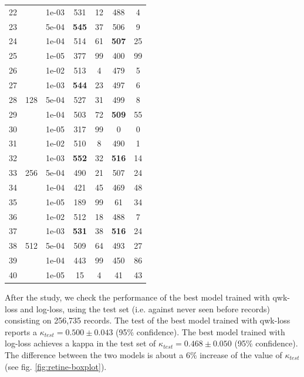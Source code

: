 \documentclass[times,twocolumn,final,authoryear]{elsarticle}
\begin{document}
\begin{table}[h!]
{\begin{tabular}{c|c|c|c|c|c|c}
			22 &                     & 1e-03 & 531 & 12 & 488 & 4\\
			23 &                     & 5e-04 & \textbf{545} & 37 & 506 & 9\\
			24 &                     & 1e-04 & 514 & 61 & \textbf{507} & 25\\
			25 &                     & 1e-05 & 377 & 99 & 400 & 99\\
			\hline	
			26 & \multirow{5}{*}{128} & 1e-02 & 513 & 4 & 479 & 5\\
			27 &                      & 1e-03 & \textbf{544} & 23 & 497 & 6\\
			28 &                      & 5e-04 & 527 & 31 & 499 & 8\\
			29 &                      & 1e-04 & 503 & 72 & \textbf{509} & 55\\
			30 &                      & 1e-05 & 317 & 99 &   0 & 0\\
			\hline	
			31 & \multirow{5}{*}{256} & 1e-02 & 510 & 8 & 490 & 1\\
			32 &                      & 1e-03 & \textbf{552} & 32 & \textbf{516} & 14\\
			33 &                      & 5e-04 & 490 & 21 & 507 & 24\\
			34 &                      & 1e-04 & 421 & 45 & 469 & 48\\
			35 &                      & 1e-05 & 189 & 99 & 61 & 34\\
			\hline	
			36 & \multirow{5}{*}{512} & 1e-02 & 512 & 18 & 488 & 7\\
			37 &                      & 1e-03 & \textbf{531} & 38 & \textbf{516} & 24\\
			38 &                      & 5e-04 & 509 & 64 & 493 & 27\\
			39 &                      & 1e-04 & 443 & 99 & 450 & 86\\
			40 &                      & 1e-05 & 15 & 4 & 41 & 43\\
			\hline			
		\end{tabular}
	}
\end{table}

After the study, we check the performance of the best model trained with qwk-loss and log-loss, using the test set (i.e. against never seen before records) consisting on 256,735 records. The test of the best model trained with qwk-loss reports a $\kappa_{test} = 0.500 \pm 0.043$ (95\% confidence). The best model trained with log-loss achieves a kappa in the test set of $\kappa_{test} = 0.468 \pm 0.050$ (95\% confidence). The difference between the two models is about a 6\% increase of the value of $\kappa_{test}$ (see fig. \ref{fig:retine-boxplot}).
\end{document}
